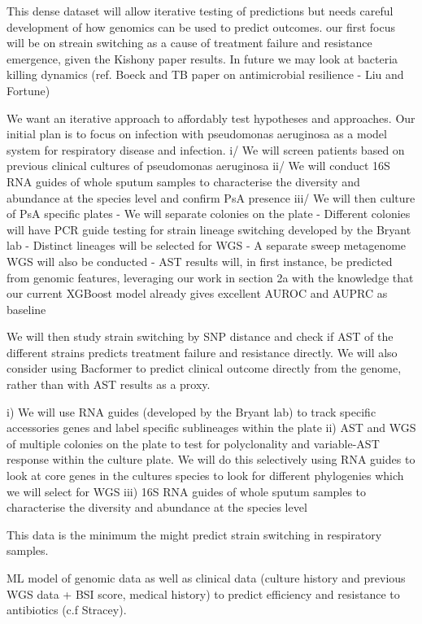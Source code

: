 This dense dataset will allow iterative testing of predictions but needs careful development of how genomics can be used to predict outcomes.
our first focus will be on streain switching as a cause of treatment failure and resistance emergence, given the Kishony paper results. 
In future we may look at bacteria killing dynamics (ref. Boeck and TB paper on antimicrobial resilience - Liu and Fortune)

We want an iterative approach to affordably test hypotheses and approaches. 
Our initial plan is to focus on infection with pseudomonas aeruginosa as a model system for respiratory disease and infection. 
i/  We will screen patients based on previous clinical cultures of pseudomonas aeruginosa
ii/  We will conduct 16S RNA guides of whole sputum samples to characterise the diversity and abundance at the species level and confirm PsA presence
iii/  We will then culture of PsA specific plates
-  We will separate colonies on the plate
-  Different colonies will have PCR guide testing for strain lineage switching developed by the Bryant lab
-  Distinct lineages will be selected for WGS
-  A separate sweep metagenome WGS will also be conducted
-  AST results will, in first instance, be predicted from genomic features, leveraging our work in section 2a with the knowledge that our current XGBoost model already gives excellent AUROC and AUPRC as baseline

We will then study strain switching by SNP distance and check if AST of the different strains predicts treatment failure and resistance directly.  
We will also consider using Bacformer to predict clinical outcome directly from the genome, rather than with AST results as a proxy. 


i)  We will use RNA guides (developed by the Bryant lab) to track specific accessories genes and label specific sublineages within the plate
ii)  AST and WGS of multiple colonies on the plate to test for polyclonality and variable-AST response within the culture plate.  We will do this selectively using RNA guides to look at core genes in the cultures species to look for different phylogenies which we will select for WGS
iii)  16S RNA guides of whole sputum samples to characterise the diversity and abundance at the species level

This data is the minimum the might predict strain switching in respiratory samples.

ML model of genomic data as well as clinical data (culture history and previous WGS data + BSI score, medical history) to predict efficiency and resistance to antibiotics (c.f Stracey). 






